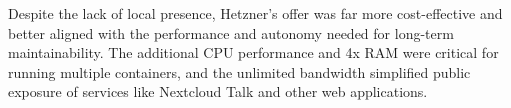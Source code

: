 Despite the lack of local presence, Hetzner's offer was far more cost-effective and better aligned with the performance and autonomy needed for long-term maintainability. The additional CPU performance and 4x RAM were critical for running multiple containers, and the unlimited bandwidth simplified public exposure of services like Nextcloud Talk and other web applications.
